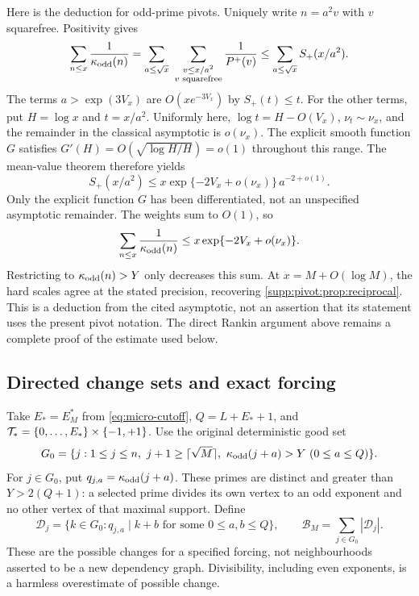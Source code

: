 Here is the deduction for odd-prime pivots. Uniquely write $n=a^2v$
with $v$ squarefree. Positivity gives
\[
 \sum_{n\le x}\frac1{\kappa_{\rm odd}(n)}
 =\sum_{a\le\sqrt x}\ \sum_{\substack{v\le x/a^2\\v\text{ squarefree}}}
                           \frac1{P^+(v)}
 \le\sum_{a\le\sqrt x} S_+(x/a^2).
\]
The terms $a>\exp(3V_x)$ are $O(xe^{-3V_x})$ by $S_+(t)\le t$.
For the other terms, put $H=\log x$ and $t=x/a^2$. Uniformly here,
$\log t=H-O(V_x)$, $\nu_t\sim\nu_x$, and the remainder in the
classical asymptotic is $o(\nu_x)$. The explicit smooth function $G$
satisfies $G'(H)=O(\sqrt{\log H/H})=o(1)$ throughout this range.
The mean-value theorem therefore yields
\[
 S_+(x/a^2)
 \le x\exp\{-2V_x+o(\nu_x)\}\,a^{-2+o(1)}.
\]
Only the explicit function $G$ has been differentiated, not an
unspecified asymptotic remainder. The weights sum to $O(1)$, so
\[
 \sum_{n\le x}\frac1{\kappa_{\rm odd}(n)}
       \le x\exp\{-2V_x+o(\nu_x)\}.
\]
Restricting to $\kappa_{\rm odd}(n)>Y$ only decreases this sum.
At $x=M+O(\log M)$, the hard scales agree at the stated precision,
recovering \cref{supp:pivot:prop:reciprocal}.
This is a deduction from the cited asymptotic, not an assertion that
its statement uses the present pivot notation. The direct Rankin
argument above remains a complete proof of the estimate used below.

\subsection{Directed change sets and exact forcing}\label{supp:pivot:sec:forcing}
Take $E_*=E_M^*$ from \eqref{eq:micro-cutoff}, $Q=L+E_*+1$, and
$\mathcal T_* =\{0,\ldots,E_*\}\times\{-1,+1\}$.
Use the original deterministic good set
\begin{equation}\label{supp:pivot:eq:good}
 G_0=\{j:1\le j\le n,\ j+1\ge\lceil\sqrt M\rceil,
                    \ \kappa_{\rm odd}(j+a)>Y\ (0\le a\le Q)\}.
\end{equation}
For $j\in G_0$, put $q_{j,a}=\kappa_{\rm odd}(j+a)$.
These primes are distinct and greater than $Y>2(Q+1)$: a selected prime divides its own vertex to an odd exponent and no other vertex of that maximal support.
Define
\begin{equation}\label{supp:pivot:eq:change-sets}
 \mathscr D_j=\{k\in G_0:q_{j,a}\mid k+b
                   \text{ for some }0\le a,b\le Q\},
 \qquad \mathscr B_M=\sum_{j\in G_0}|\mathscr D_j|.
\end{equation}
These are the possible changes for a specified forcing, not neighbourhoods asserted to be a new dependency graph. Divisibility, including even exponents, is a harmless overestimate of possible change.

